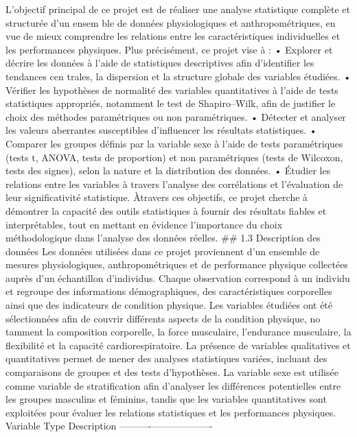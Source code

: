 \documentclass[
]{article}
\begin{document}
L'objectif principal de ce projet est de réaliser une analyse
statistique complète et structurée d'un ensem ble de données
physiologiques et anthropométriques, en vue de mieux comprendre les
relations entre les caractéristiques individuelles et les performances
physiques. Plus précisément, ce projet vise à : • Explorer et décrire
les données à l'aide de statistiques descriptives afin d'identifier les
tendances cen trales, la dispersion et la structure globale des
variables étudiées. • Vérifier les hypothèses de normalité des variables
quantitatives à l'aide de tests statistiques appropriés, notamment le
test de Shapiro--Wilk, afin de justifier le choix des méthodes
paramétriques ou non paramétriques. • Détecter et analyser les valeurs
aberrantes susceptibles d'influencer les résultats statistiques. •
Comparer les groupes définis par la variable sexe à l'aide de tests
paramétriques (tests t, ANOVA, tests de proportion) et non paramétriques
(tests de Wilcoxon, tests des signes), selon la nature et la
distribution des données. • Étudier les relations entre les variables à
travers l'analyse des corrélations et l'évaluation de leur
significativité statistique. Àtravers ces objectifs, ce projet cherche à
démontrer la capacité des outils statistiques à fournir des résultats
fiables et interprétables, tout en mettant en évidence l'importance du
choix méthodologique dans l'analyse des données réelles. \#\# 1.3
Description des données Les données utilisées dans ce projet proviennent
d'un ensemble de mesures physiologiques, anthropométriques et de
performance physique collectées auprès d'un échantillon d'individus.
Chaque observation correspond à un individu et regroupe des informations
démographiques, des caractéristiques corporelles ainsi que des
indicateurs de condition physique. Les variables étudiées ont été
sélectionnées afin de couvrir différents aspects de la condition
physique, no tamment la composition corporelle, la force musculaire,
l'endurance musculaire, la flexibilité et la capacité
cardiorespiratoire. La présence de variables qualitatives et
quantitatives permet de mener des analyses statistiques variées,
incluant des comparaisons de groupes et des tests d'hypothèses. La
variable sexe est utilisée comme variable de stratification afin
d'analyser les différences potentielles entre les groupes masculins et
féminins, tandis que les variables quantitatives sont exploitées pour
évaluer les relations statistiques et les performances physiques.
\textbar{} Variable \textbar{} Type \textbar{} Description \textbar{}
\textbar----------\textbar------\textbar-------------\textbar{}
\end{document}

